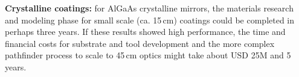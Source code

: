 \textbf{Crystalline coatings:} for AlGaAs crystalline mirrors, the materials research and modeling phase for small scale (ca. 15\,cm) coatings could be completed in perhaps three years. If these results showed high performance, the time and financial costs for substrate and tool development and the more complex pathfinder process to scale to 45\,cm optics might take about USD 25M and 5 years. 

 


